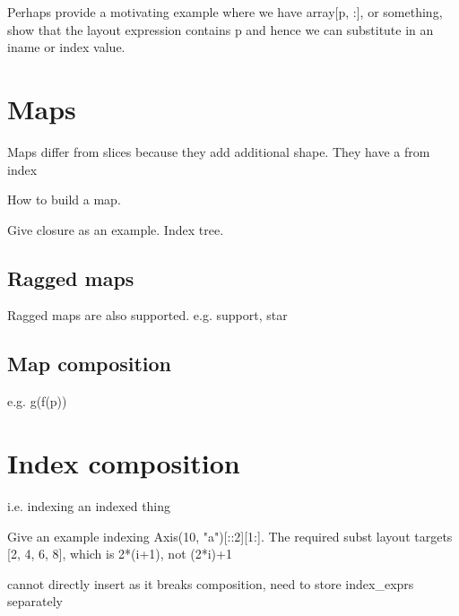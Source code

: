 \documentclass[thesis]{subfiles}
\begin{document}
Perhaps provide a motivating example where we have array[p, :], or something, show that the layout expression contains p and hence we can substitute in an iname or index value.

\section{Maps}

Maps differ from slices because they add additional shape. They have a from index

How to build a map.

Give closure as an example. Index tree.

\subsection{Ragged maps}

Ragged maps are also supported. e.g. support, star

\subsection{Map composition}

e.g. g(f(p))

\section{Index composition}

i.e. indexing an indexed thing

Give an example indexing Axis(10, "a")[::2][1:].
The required subst layout targets [2, 4, 6, 8], which is 2*(i+1), not (2*i)+1

cannot directly insert as it breaks composition, need to store index_exprs separately
\end{document}

